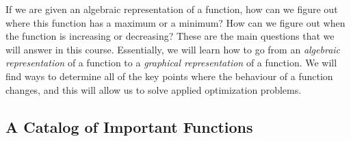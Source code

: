 \documentclass[letterpaper,12pt,oneside]{book}
\theoremstyle{definition}
\begin{document}
{If we are given an algebraic representation of a function, how can we figure out where this function has a maximum or a minimum?  How can we figure out when the function is increasing or decreasing?  These are the main questions that we will answer in this course.  Essentially, we will learn how to go from an \emph{algebraic representation} of a function to a \emph{graphical representation} of a function.  We will find ways to determine all of the key points where the behaviour of a function changes, and this will allow us to solve applied optimization problems.

\newpage

\subsection*{A Catalog of Important Functions}

}
\end{document}
